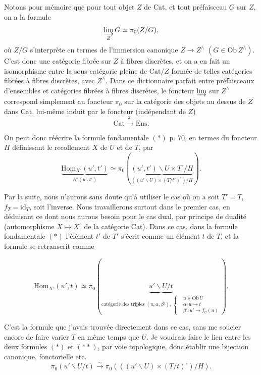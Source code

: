 \documentclass[11pt]{article}
\newcommand{\printedpage}[1]{\marginpar{\footnotesize p.~#1}}
\newcommand{\msp}[1]{\marginpar{\footnotesize [#1]}}
\newcommand{\Hom}{\mathrm{Hom}}
\newcommand{\Cat}{\mathrm{Cat}}
\newcommand{\Ens}{\mathrm{Ens}}
\newcommand{\id}{\mathrm{id}}
\newcommand{\Ob}{\mathrm{Ob}\,}
\begin{document}
Notons pour mémoire que pour tout objet $Z$ de Cat, et tout préfaisceau $G$ sur $Z$, on a la formule
\[
\varinjlim_{Z} G \simeq \pi_0(Z/G),
\]
où $Z/G$ s'interprète en termes de l'immersion canonique $Z\longrightarrow Z^{\wedge}$ $(G\in \Ob Z^{\wedge})$. C'est donc une catégorie fibrée sur $Z$ à fibres discrètes, et on a en fait un isomorphisme entre la sous-catégorie pleine de $\Cat/Z$ formée de telles catégories fibrées à fibres discrètes, avec $Z^{\wedge}$. Dans ce dictionnaire parfait entre préfaisceaux d'ensembles et catégories fibrées à fibres discrètes, le foncteur $\varinjlim$ sur $Z^{\wedge}$ correspond simplement au foncteur $\pi_0$ sur la catégorie des objets au dessus de $Z$ dans Cat, lui-même induit par le foncteur (indépendant de $Z$)
\[
\Cat \xrightarrow{\pi_0} \Ens.
\]

\msp{page 72} On peut donc réécrire la formule fondamentale $(*)$ p. 70, en termes du foncteur $H$ définissant le recollement $X$ de $U$ et de $T$, par
\[
\boxed{\underbrace{\Hom_{X'}(u',t')}_{H'(u',t')} \simeq \pi_0(\underbrace{(u',t')\backslash U\times T^{\circ}/H}_{((u'\backslash U)\times(T/t')^{\circ})/H}).}
\tag*{$(*)$}
\]

Par la suite, nous n'aurons sans doute qu'à utiliser le cas où on a soit $T'=T$, $f_T=\id_T$, soit l'inverse. Nous travaillerons surtout dans le premier cas, en déduisant ce dont nous aurons besoin pour le cas dual, par principe de dualité (automorphisme $X\longmapsto X^{\circ}$ de la
\printedpage{52}
catégorie Cat). Dans ce cas, dans la formule fondamentale $(*)$ l'élément $t'$ de $T'$ s'écrit comme un élément $t$ de $T$, et la formule se retranscrit comme
\par{}
\[
\boxed{\Hom_{X'}(u',t) \simeq \pi_0(\underbrace{u'\backslash U/t}_{\text{catégorie des triples } (u,\alpha,\beta'),\ \left\{\begin{aligned} &u\in \Ob U\\ &\alpha : u\longrightarrow t\\ &\beta' : u'\longrightarrow f_U(u)\end{aligned}\right.}).}
\tag*{$(**)$}
\]

C'est la formule que j'avais trouvée directement dans ce cas, sans me soucier encore de faire varier $T$ en même temps que $U$. Je voudrais faire le lien entre les deux formules $(*)$ et $(**)$, par voie topologique, donc établir une bijection canonique, fonctorielle etc.
\[
\pi_0(u'\backslash U/t) \xrightarrow{\sim} \pi_0(((u'\backslash U)\times(T/t)^{\circ})/H).
\]
\end{document}
